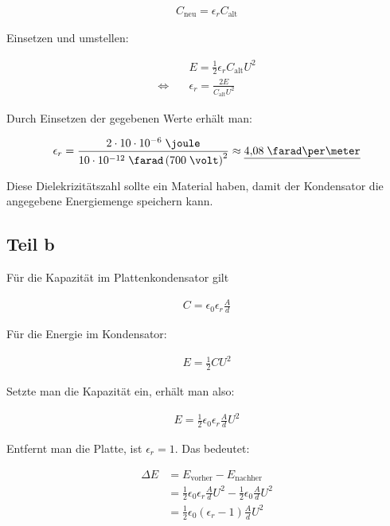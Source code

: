 \documentclass[a4paper,german,12pt,smallheadings]{scrartcl}
\begin{document}
\begin{align*}
  C_{\text{neu}} = \epsilon_r C_\text{alt}
\end{align*}

Einsetzen und umstellen:

\begin{align*}
  &E = \frac{1}{2} \epsilon_r C_\text{alt} U^2 \\
  \Leftrightarrow \quad &\epsilon_r = \frac{2E}{C_\text{alt} U^2}
\end{align*}

Durch Einsetzen der gegebenen Werte erhält man:

\begin{align*}
  \epsilon_r = \frac{2 \cdot 10 \cdot 10^{-6}\;\joule}{10 \cdot 10^{-12}\; \farad \left(700\; \volt\right)^2} \approx \underline{4{,}08\; \farad\per\meter}
\end{align*}

Diese Dielekrizitätszahl sollte ein Material haben, damit der Kondensator die
angegebene Energiemenge speichern kann.

\subsection*{Teil b}

Für die Kapazität im Plattenkondensator gilt

\begin{align*}
  C = \epsilon_0 \epsilon_r \frac{A}{d}
\end{align*}

Für die Energie im Kondensator:

\begin{align*}
  E = \frac{1}{2} C U^2
\end{align*}


Setzte man die Kapazität ein, erhält man also:

\begin{align*}
  E = \frac{1}{2} \epsilon_0 \epsilon_r \frac{A}{d}  U^2
\end{align*}

Entfernt man die Platte, ist $\epsilon_r = 1$. Das bedeutet:

\begin{align*}
  \Delta E &= E_\text{vorher} - E_\text{nachher}  \\ 
           &= \frac{1}{2} \epsilon_0 \epsilon_r \frac{A}{d}  U^2 - \frac{1}{2} \epsilon_0 \frac{A}{d}  U^2 \\
           &= \frac{1}{2} \epsilon_0 (\epsilon_r - 1) \frac{A}{d}  U^2
\end{align*}
\end{document}
